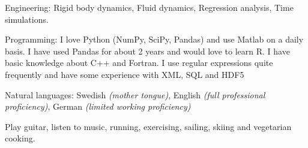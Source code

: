 \documentclass[10pt,a4paper]{article} %
\begin{document}

\inlineheadsection %
{Engineering:}
{Rigid body dynamics, Fluid dynamics, Regression analysis, Time simulations.}

\inlineheadsection %
{Programming:}
{I love Python (NumPy, SciPy, Pandas) and use Matlab on a daily basis. I have used Pandas for about 2 years and would love to learn R. I have basic knowledge about C++ and Fortran. I use regular expressions quite frequently and have some experience with XML, SQL and HDF5}


\inlineheadsection %
{Natural languages:}
{Swedish \textit{(mother tongue)}, English \textit{(full professional proficiency)}, German \textit{(limited working proficiency)}}


\spacedhrule{1.6em}{-0.4em} %


Play guitar, listen to music, running, exercising, sailing, skiing and vegetarian cooking.

\end{document}
